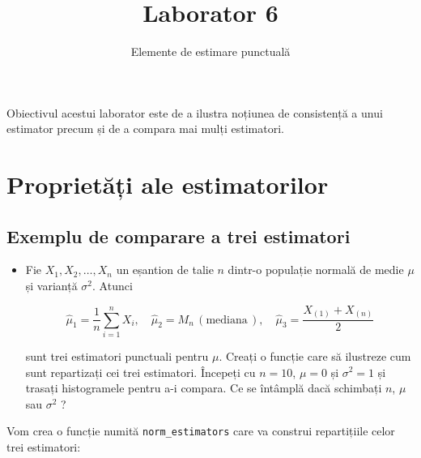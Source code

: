 \documentclass[]{article}
\title{Laborator 6}
\subtitle{Elemente de estimare punctuală}
\author{}
\date{}
\newenvironment{frshaded*}{%
  \def\FrameCommand{\fboxrule=\FrameRule\fboxsep=\FrameSep \fcolorbox{framecolor}{shadecolor1}}%
  \MakeFramed {\advance\hsize-\width \FrameRestore}}%
{\endMakeFramed}
\newenvironment{rmdblock}[1]
  {\begin{frshaded*}
  \begin{itemize}
  \renewcommand{\labelitemi}{
    \raisebox{-.7\height}[0pt][0pt]{
      {\setkeys{Gin}{width=2em,keepaspectratio}\texttt{[image: images/icons/\#1]}}
    }
  }
  \item
  }
  {
  \end{itemize}
  \end{frshaded*}
  }
\newenvironment{rmdexercise}
  {\begin{rmdblock}{exercise}}
  {\end{rmdblock}}
\begin{document}
\maketitle

\thispagestyle{fancy}

Obiectivul acestui laborator este de a ilustra noțiunea de consistență a
unui estimator precum și de a compara mai mulți estimatori.

\section{Proprietăți ale
estimatorilor}\label{proprietati-ale-estimatorilor}

\subsection{Exemplu de comparare a trei
estimatori}\label{exemplu-de-comparare-a-trei-estimatori}

\begin{rmdexercise}
Fie \(X_1,X_2,\ldots,X_n\) un eșantion de talie \(n\) dintr-o populație
normală de medie \(\mu\) și varianță \(\sigma^2\). Atunci

\[
  \hat{\mu}_1 = \frac{1}{n}\sum_{i=1}^{n}X_i, \quad \hat{\mu}_2 = M_n\,(\text{mediana}\,), \quad \hat{\mu}_3 = \frac{X_{(1)} + X_{(n)}}{2}
\]

sunt trei estimatori punctuali pentru \(\mu\). Creați o funcție care să
ilustreze cum sunt repartizați cei trei estimatori. Începeți cu
\(n = 10\), \(\mu = 0\) și \(\sigma^2 = 1\) și trasați histogramele
pentru a-i compara. Ce se întâmplă dacă schimbați \(n\), \(\mu\) sau
\(\sigma^2\) ?
\end{rmdexercise}

Vom crea o funcție numită \texttt{norm\_estimators} care va construi
repartițiile celor trei estimatori:
\end{document}
